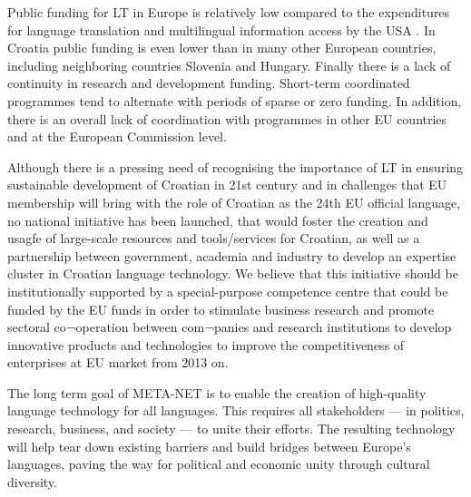 \begin{multicols}{2}
Public funding for LT in Europe is relatively low compared to the expenditures for language translation and multilingual information access by the USA \cite{str36}. In Croatia public funding is even lower than in many other European countries, including neighboring countries Slovenia and Hungary. Finally there is a lack of continuity in research and development funding. Short-term coordinated programmes tend to alternate with periods of sparse or zero funding. In addition, there is an overall lack of coordination with programmes in other EU countries and at the European Commission level.

Although there is a pressing need of recognising the importance of LT in ensuring sustainable development of Croatian in 21st century and in challenges that EU membership will bring with the role of Croatian as the 24th EU official language, no national initiative has been launched, that would foster the creation and usagfe of large-scale resources and tools/services for Croatian, as well as a partnership between government, academia and industry to develop an expertise cluster in Croatian language technology. We believe that this initiative should be institutionally supported by a special-purpose competence centre that could be funded by the EU funds in order to stimulate business research and promote sectoral co¬operation between com¬panies and research institutions to develop innovative products and technologies to improve the competitiveness of enterprises at EU market from 2013 on.

The long term goal of META-NET is to enable the creation of high-quality language technology for all languages. This requires all stakeholders — in politics, research, business, and society — to unite their efforts. The resulting technology will help tear down existing barriers and build bridges between Europe’s languages, paving the way for political and economic unity through cultural diversity.

\end{multicols}
\clearpage
